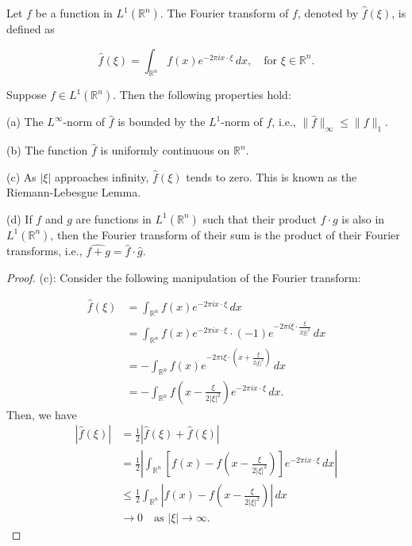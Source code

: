 \begin{definition}
    Let $f$ be a function in $L^{1}\left(\mathbb{R}^n\right)$. The Fourier transform of $f$, denoted by $\hat{f}(\xi)$, is defined as

$$\hat{f}(\xi)=\int_{\mathbb{R}^n} f(x) e^{-2 \pi i x \cdot \xi} \, dx, \quad \text{for } \xi \in \mathbb{R}^n.$$
\end{definition}
\begin{proposition}
    Suppose $f \in L^{1}\left(\mathbb{R}^n\right)$. Then the following properties hold:

(a) The $L^{\infty}$-norm of $\hat{f}$ is bounded by the $L^{1}$-norm of $f$, i.e., $\|\hat{f}\|_{\infty} \leqslant\|f\|_1$.

(b) The function $\hat{f}$ is uniformly continuous on $\mathbb{R}^n$.

(c) As $|\xi|$ approaches infinity, $\hat{f}(\xi)$ tends to zero. This is known as the Riemann-Lebesgue Lemma.

(d) If $f$ and $g$ are functions in $L^{1}\left(\mathbb{R}^n\right)$ such that their product $f \cdot g$ is also in $L^{1}\left(\mathbb{R}^n\right)$, then the Fourier transform of their sum is the product of their Fourier transforms, i.e., $\widehat{f+g}=\hat{f} \cdot \hat{g}$.
\end{proposition}
\begin{proof}
    (c):
Consider the following manipulation of the Fourier transform:

$$\begin{aligned}
\hat{f}(\xi) &= \int_{\mathbb{R}^n} f(x) e^{-2 \pi i x \cdot \xi} \, dx \\
&= \int_{\mathbb{R}^n} f(x) e^{-2 \pi i x \cdot \xi} \cdot (-1) e^{-2 \pi i \xi \cdot \frac{\xi}{2|\xi|^2}} \, dx \\
&= -\int_{\mathbb{R}^n} f(x) e^{-2 \pi i \xi \cdot \left(x + \frac{\xi}{2|\xi|^2}\right)} \, dx \\
&= -\int_{\mathbb{R}^n} f\left(x - \frac{\xi}{2|\xi|^2}\right) e^{-2 \pi i x \cdot \xi} \, dx.
\end{aligned}$$
Then, we have
$$\begin{aligned}
|\hat{f}(\xi)| &= \frac{1}{2}|\hat{f}(\xi) + \hat{f}(\xi)| \\
&= \frac{1}{2}\left|\int_{\mathbb{R}^n} \left[f(x) - f\left(x - \frac{\xi}{2|\xi|^2}\right)\right] e^{-2 \pi i x \cdot \xi} \, dx\right| \\
&\leqslant \frac{1}{2} \int_{\mathbb{R}^n} \left|f(x) - f\left(x - \frac{\xi}{2|\xi|^2}\right)\right| \, dx \\
&\rightarrow 0 \quad \text{as } |\xi| \rightarrow \infty.
\end{aligned}$$

\end{proof}
